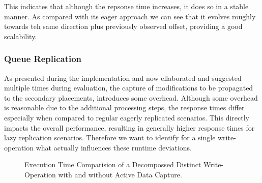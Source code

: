 This indicates that although the repsonse time increases, it does so in a stable manner. As compared with its eager approach we can see that it evolves roughly towards teh same direction plus
previously observed offset, providing a good scalability.

\subsubsection{Queue Replication}


As presented during the implementation and now ellaborated and suggested multiple times during evaluation, 
the capture of modifications to be propagated to the secondary placements, introduces some overhead. Although some overhead
is reasonable due to the additional processing steps, the response times differ 
especially when compared to regular eagerly replicated scenarios. This directly impacts the overall performance,
resulting in generally higher response times for lazy replication scenarios.
Therefore we want to identify for a single write-operation what actually influences these runtime deviations.


\begin{figure}[t] 
    \centering 
    \caption{Execution Time Comparision of a Decompossed Distinct Write-Operation with and without Active Data Capture.}
    \label{fig:write_decomposition}
\end{figure}



